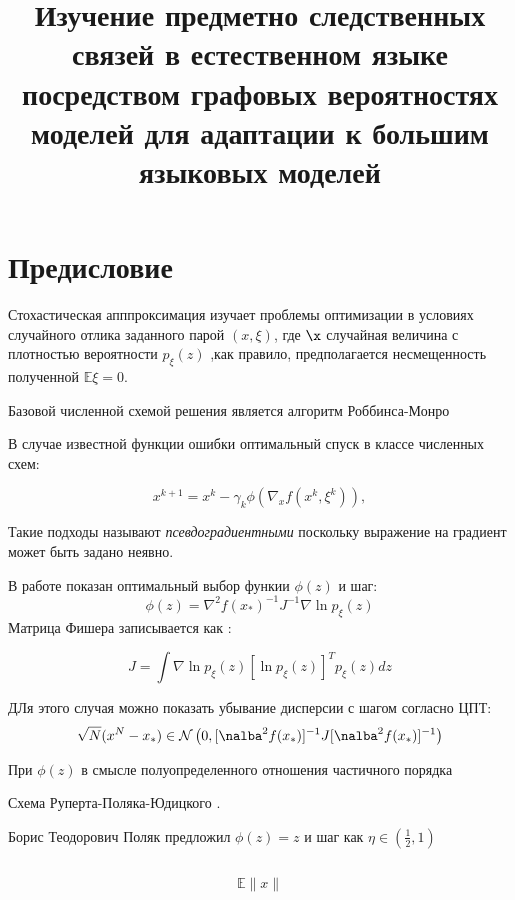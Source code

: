 \documentclass{article}
\begin{document}
\title{Изучение предметно следственных связей в естественном языке посредством графовых вероятностях моделей для адаптации к большим языковых моделей}

\section{Предисловие}

Стохастическая апппроксимация изучает 
проблемы оптимизации в условиях случайного отлика
заданного парой $(x,\xi)$, где $\x$ случайная величина
с плотностью вероятности $p_\xi(z)$
,как правило, предполагается несмещенность 
полученной $\mathbb{E}\xi=0$.

Базовой численной схемой решения является алгоритм
Роббинса-Монро \cite{monro1951}

В случае
известной функции ошибки оптимальный спуск 
в классе численных схем:

$$
    x^{k+1} = x^{k} - \gamma_k \phi(\nabla_x f(x^k,\xi^k)),
$$

Такие подходы называют \textit{псевдоградиентными} поскольку
выражение на градиент может быть задано неявно.

В работе \cite{поляк1980оптимальные} показан
оптимальный выбор функии $\phi(z)$ и шаг:
$$
   \phi(z) = \nabla^2 f(x_*)^{-1} J^{-1} \nabla \ln p_\xi (z)  
$$
Матрица Фишера записывается как :

$$
    J = \int \nabla \ln p_\xi(z) [\ln p_\xi(z)]^T p_\xi (z) dz
$$

ДЛя этого случая можно показать убывание дисперсии с шагом согласно ЦПТ:
$$
    \sqrt{N} (x^N - x_*) \in \mathcal{N}\left(0,[\nalba^2 f(x_*)]^{-1}J[\nalba^2 f(x_*)]^{-1}\right)
$$

При  $\phi(z)$ в смысле полуопределенного отношения частичного порядка

Схема Руперта-Поляка-Юдицкого \cite{поляк1990новый} 
\cite{ruppert1988efficient}.

Борис Теодорович Поляк предложил $\phi(z)=z$ 
и шаг как $\eta \in (\frac{1}{2},1)$

\cite{polyak1992acceleration} 

$$
    
$$




$$
    \mathbb{E} \| x \|
$$
\end{document}
